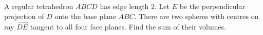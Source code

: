 A regular tetrahedron $ABCD$ has edge length $2$. Let $E$ be the perpendicular projection of $D$ onto the base plane $ABC$. There are two spheres with centres on ray $\overrightarrow{DE}$ tangent to all four face planes. Find the sum of their volumes.
